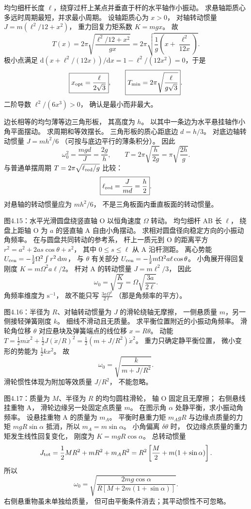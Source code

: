 均匀细杆长度 $\ell$，绕穿过杆上某点并垂直于杆的水平轴作小振动。
求悬轴距质心多远时周期最短，并求最小周期。
\exsolution
设轴距质心为 $x>0$，
对轴转动惯量
$J=m(\ell^2/12+x^2)$，
重力回复力矩系数 $K=mgx$。
故
\[
T(x)=2\pi\sqrt{\frac{\ell^2/12+x^2}{gx}}
=2\pi\sqrt{\frac1g\left(x+\frac{\ell^2}{12x}\right)}.
\]
极小点满足
$\mathrm d(x+\ell^2/(12x))/\mathrm dx
=1-\ell^2/(12x^2)=0$，于是
\[
\boxed{x_{\rm opt}=\frac{\ell}{2\sqrt3}},
\qquad
\boxed{T_{\min}=2\pi\sqrt{\frac{\ell}{g\sqrt3}}}.
\]
\excheck 二阶导数
$\ell^2/(6x^3)>0$，
确认是最小而非最大。

边长相等的均匀薄等边三角形板，
其高度为 $h$。
以其中一条边为水平悬挂轴作小角平面摆动。
求周期和等效摆长。
\exsolution
三角形板的质心距底边
$d=h/3$。
对底边轴转动惯量
$J=m h^2/6$
（可按与底边平行的薄条积分）。
因此
\[
\omega_0^2=\frac{mgd}{J}
=\frac{2g}{h},
\qquad
\boxed{T=2\pi\sqrt{\frac{h}{2g}}
=\pi\sqrt{\frac{2h}{g}}}.
\]
与普通单摆周期
$T=2\pi\sqrt{\ell_{\rm red}/g}$
比较：
\[
\boxed{\ell_{\rm red}=\frac{J}{md}=\frac h2}.
\]
\excheck 对悬轴的转动惯量应为 $mh^2/6$，
不是三角板面内垂直板面的转动惯量。

图4.15：水平光滑圆盘绕竖直轴 O
以恒角速度 $\Omega$ 转动。
均匀细杆 AB 长 $\ell$，
绕盘上距轴 O 为 $a$ 的竖直轴 A 自由小角摆动。
求相对圆盘径向稳定方向的小振动角频率。
\exsolution
在与圆盘共同转动的参考系，
杆上一质元到 O 的距离平方
$r^2=a^2+2as\cos\theta+s^2$，
其中 $0\le s\le\ell$ 从 A 沿杆测距。
离心势能
$U_{\rm cen}=-\tfrac12\Omega^2\int r^2\,\mathrm dm$，
与 $\theta$ 有关部分
$U_{\rm cen}=-\tfrac12m\Omega^2a\ell\cos\theta$。
小角展开得回复刚度
$K=m\Omega^2a\ell/2$。
杆对 A 的转动惯量
$J=m\ell^2/3$，
因此
\[
\boxed{\omega_0=
\sqrt{\frac KJ}
=\Omega\sqrt{\frac{3a}{2\ell}}}.
\]
\excheck 角频率维度为 $\mathrm{s^{-1}}$，
故不能只写 $\frac{3a\Omega^2}{2\ell}$
（那是角频率的平方）。

图4.16：半径为 $R$、对轴转动惯量为 $J$ 的滑轮绕轴无摩擦，
一侧悬质量 $m$，另一侧接轻弹簧刚度 $k$。
细线不滑动且无质量。
求平衡位置附近的小振动角频率。
\exsolution
滑轮角位移 $\theta$ 对应悬块及弹簧端点的线位移
$x=R\theta$。
动能
$T=\tfrac12m\dot x^2+
\tfrac12J(\dot x/R)^2
=\tfrac12(m+J/R^2)\dot x^2$。
重力只确定静平衡位置，
微小变形的势能为
$\tfrac12kx^2$。
故
\[
\boxed{\omega_0=
\sqrt{\frac{k}{m+J/R^2}}}.
\]
\excheck 滑轮惯性体现为附加等效质量 $J/R^2$，
不能忽略。

图4.17：质量为 $M$、半径为 $R$ 的均匀圆柱滑轮，
轴 O 固定且无摩擦；
右侧悬线挂重物 A，
滑轮边缘另一处固定点质量 $m$。
在图示角 $\alpha$ 处静平衡，求小振动角频率。
\exsolution
设悬挂重物 A 的质量为 $m_A$。
平衡时悬重力矩
$m_AgR$ 与边缘点质量的力矩
$mgR\sin\alpha$ 抵消，所以
$m_A=m\sin\alpha$。
小角偏离 $\delta\theta$ 时，
仅边缘点质量的重力矩发生线性回复变化，
刚度为
$K=mgR\cos\alpha$。
总转动惯量
\[
J_{\rm tot}=\frac12MR^2+mR^2+m_AR^2
=R^2\left[\frac M2+m(1+\sin\alpha)\right].
\]
所以
\[
\boxed{\omega_0=
\sqrt{\frac{2mg\cos\alpha}
{R[M+2m(1+\sin\alpha)]}}}.
\]
\excheck 右侧悬重物虽未单独给质量，
但可由平衡条件消去；其平动惯性不可忽略。

